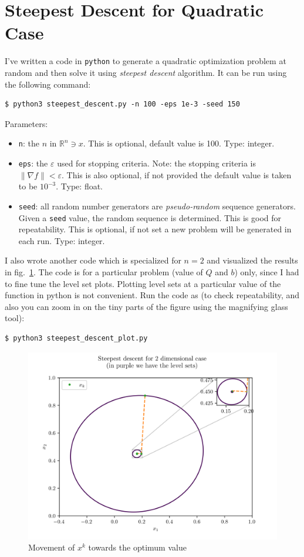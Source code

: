 \documentclass[11pt]{article}
\begin{document}
\section{Steepest Descent for Quadratic Case}
I've written a code in \verb:python: to generate a quadratic optimization problem at
random and then solve it using \textit{steepest descent} algorithm. It can be run
using the following command:\par
\begin{verbatim}
$ python3 steepest_descent.py -n 100 -eps 1e-3 -seed 150
\end{verbatim}
Parameters:
\begin{itemize}
    \item \verb:n:: the $n$ in $\mathbb{R}^n\ni x$. This is optional, default
        value is 100. Type: integer.
    \item \verb:eps:: the $\varepsilon$ used for stopping criteria. Note: the stopping
        criteria is \hbox{$\lVert\nabla f\rVert<\varepsilon$.} This is also optional,
        if not provided the default value is taken to be $10^{-3}$. Type: float.
    \item \verb:seed:: all random number generators are \textit{pseudo-random}
        sequence generators. Given a \verb:seed: value, the random sequence is
        determined. This is good for repeatability. This is optional, if not set
        a new problem will be generated in each run. Type: integer.
\end{itemize}
I also wrote another code which is specialized for $n=2$ and visualized the results
in fig.~\ref{fig:contour_sd}. The code is for a particular problem (value of
$Q$ and $b$) only, since I had to fine tune the level set plots. Plotting level sets
at a particular value of the function in python is not convenient. Run the code
as (to check repeatability, and also you can zoom in on the tiny parts of the figure
using the magnifying glass tool):
\begin{verbatim}
$ python3 steepest_descent_plot.py
\end{verbatim}
\begin{figure}[!htbp]
    \includegraphics[width=\textwidth]{./contour_plot_1.png}
    \caption{Movement of $x^k$ towards the optimum value\label{fig:contour_sd}}
\end{figure}
\end{document}
